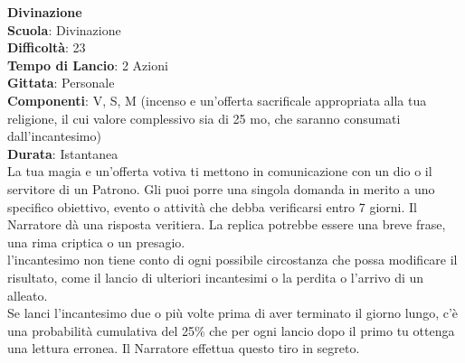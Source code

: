 \begin{multicols}{2}
\medskip\textbf{Divinazione}\\
\textbf{Scuola}: Divinazione\\
\textbf{Difficoltà}:  23\\
\textbf{Tempo di Lancio}: 2 Azioni\\
\textbf{Gittata}: Personale\\
\textbf{Componenti}: V, S, M (incenso e un'offerta sacrificale appropriata alla tua religione, il cui valore complessivo sia di 25 mo, che saranno consumati dall'incantesimo)\\
\textbf{Durata}: Istantanea\\
La tua magia e un'offerta votiva ti mettono in comunicazione con un dio o il servitore di un Patrono. Gli puoi porre una singola domanda in merito a uno specifico obiettivo, evento o attività che debba verificarsi entro 7 giorni. Il Narratore dà una risposta veritiera. La replica potrebbe essere una breve frase, una rima criptica o un presagio. \\
l'incantesimo non tiene conto di ogni possibile circostanza che possa modificare il risultato, come il lancio di ulteriori incantesimi o la perdita o l’arrivo di un alleato.\\
Se lanci l'incantesimo due o più volte prima di aver terminato il giorno lungo, c’è una probabilità cumulativa del 25\% che per ogni lancio dopo il primo tu ottenga una lettura erronea. Il Narratore effettua questo tiro in segreto. 


\end{multicols}
